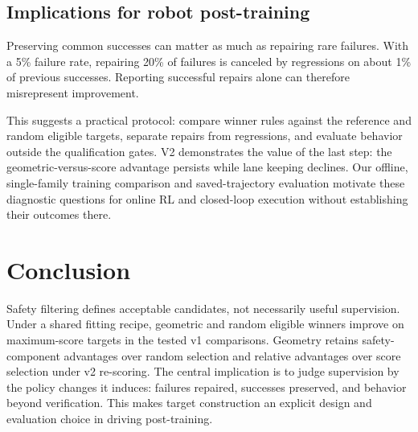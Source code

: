 \documentclass[letterpaper,10pt,conference]{ieeeconf}
\begin{document}
\subsection{Implications for robot post-training}
Preserving common successes can matter as much as repairing rare failures. With a 5\% failure rate, repairing 20\% of failures is canceled by regressions on about 1\% of previous successes. Reporting successful repairs alone can therefore misrepresent improvement.

This suggests a practical protocol: compare winner rules against the reference and random eligible targets, separate repairs from regressions, and evaluate behavior outside the qualification gates. V2 demonstrates the value of the last step: the geometric-versus-score advantage persists while lane keeping declines. Our offline, single-family training comparison and saved-trajectory evaluation motivate these diagnostic questions for online RL and closed-loop execution without establishing their outcomes there.

\section{Conclusion}
Safety filtering defines acceptable candidates, not necessarily useful supervision. Under a shared fitting recipe, geometric and random eligible winners improve on maximum-score targets in the tested v1 comparisons. Geometry retains safety-component advantages over random selection and relative advantages over score selection under v2 re-scoring. The central implication is to judge supervision by the policy changes it induces: failures repaired, successes preserved, and behavior beyond verification. This makes target construction an explicit design and evaluation choice in driving post-training.
\end{document}
